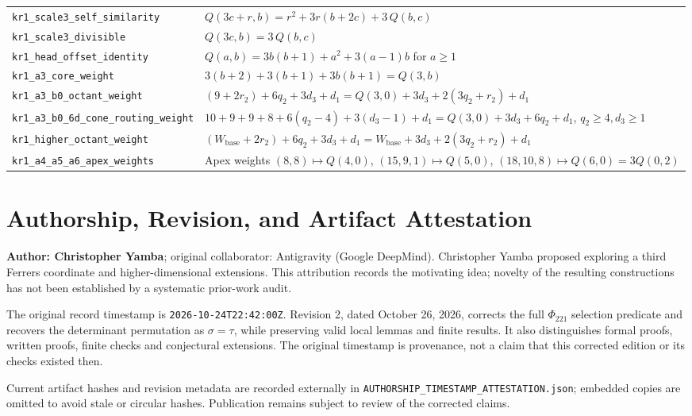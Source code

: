 \documentclass[11pt]{article}
\theoremstyle{definition}
\begin{document}
\begin{center}
{\begin{tabular}{@{}ll@{}}
\nolinkurl{kr1_scale3_self_similarity} & $Q(3c+r, b) = r^2 + 3r(b+2c) + 3\,Q(b, c)$ \\
\texttt{kr1\_scale3\_divisible} & $Q(3c, b) = 3\,Q(b, c)$ \\
\nolinkurl{kr1_head_offset_identity} & $Q(a, b) = 3b(b+1) + a^2 + 3(a-1)b$ for $a \ge 1$ \\
\texttt{kr1\_a3\_core\_weight} & $3(b+2) + 3(b+1) + 3b(b+1) = Q(3, b)$ \\
\nolinkurl{kr1_a3_b0_octant_weight} & $(9 + 2r_2) + 6q_2 + 3d_3 + d_1 = Q(3, 0) + 3d_3 + 2(3q_2 + r_2) + d_1$ \\
\nolinkurl{kr1_a3_b0_6d_cone_routing_weight} & $10 + 9 + 9 + 8 + 6(q_2-4) + 3(d_3-1) + d_1 = Q(3, 0) + 3d_3 + 6q_2 + d_1$, $q_2\ge4,d_3\ge1$ \\
\nolinkurl{kr1_higher_octant_weight} & $(W_{\mathrm{base}} + 2r_2) + 6q_2 + 3d_3 + d_1 = W_{\mathrm{base}} + 3d_3 + 2(3q_2 + r_2) + d_1$ \\
\nolinkurl{kr1_a4_a5_a6_apex_weights} & Apex weights $(8,8) \mapsto Q(4,0)$, $(15,9,1) \mapsto Q(5,0)$, $(18,10,8) \mapsto Q(6,0) = 3Q(0,2)$ \\
\bottomrule
\end{tabular}%
}
\end{center}

\section{Authorship, Revision, and Artifact Attestation}
\textbf{Author: Christopher Yamba}; original collaborator: Antigravity (Google DeepMind). Christopher Yamba proposed exploring a third Ferrers coordinate and higher-dimensional extensions. This attribution records the motivating idea; novelty of the resulting constructions has not been established by a systematic prior-work audit.

The original record timestamp is \texttt{2026-10-24T22:42:00Z}. Revision 2, dated October 26, 2026, corrects the full $\Phi_{221}$ selection predicate and recovers the determinant permutation as $\sigma=\tau$, while preserving valid local lemmas and finite results. It also distinguishes formal proofs, written proofs, finite checks and conjectural extensions. The original timestamp is provenance, not a claim that this corrected edition or its checks existed then.

Current artifact hashes and revision metadata are recorded externally in \nolinkurl{AUTHORSHIP_TIMESTAMP_ATTESTATION.json}; embedded copies are omitted to avoid stale or circular hashes. Publication remains subject to review of the corrected claims.
\end{document}
